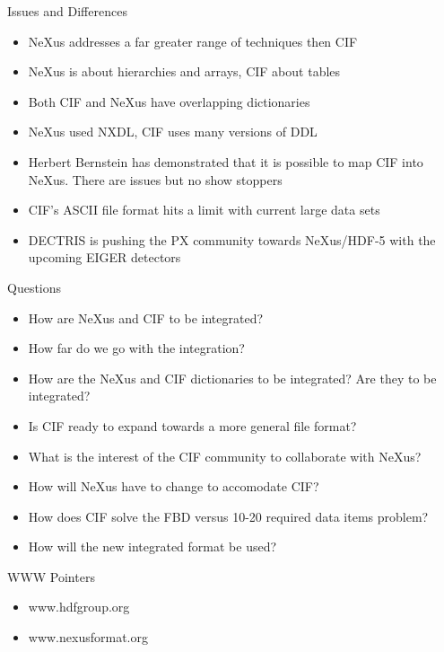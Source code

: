 \documentclass{beamer}
\begin{document}
\begin{frame}{Issues and Differences}
\begin{itemize}
\item NeXus addresses a far greater range of techniques then CIF
\item NeXus is about hierarchies and arrays, CIF about tables
\item Both CIF and NeXus have overlapping dictionaries
\item NeXus used NXDL, CIF uses many versions of DDL
\item Herbert Bernstein has demonstrated that it is possible to map CIF into NeXus. There are issues but 
 no show stoppers
 \item CIF's ASCII file format hits a limit with current large data sets
\item DECTRIS is pushing the PX community towards NeXus/HDF-5 with the upcoming EIGER detectors
\end{itemize}
\end{frame}

\begin{frame}{Questions}
\begin{itemize}
\item How are NeXus and CIF to be integrated?
\item How far do we go with the integration?
\item How are the NeXus and CIF dictionaries to be integrated? Are they to be integrated?
\item Is CIF ready to expand towards a more general file format?
\item What is the interest of the CIF community to collaborate with NeXus?
\item How will NeXus have to change to accomodate CIF?
\item How does CIF solve the FBD versus 10-20 required data items problem? 
\item How will the new integrated format be used?
\end{itemize}
\end{frame}

\begin{frame}{WWW Pointers}
\begin{itemize}
\item www.hdfgroup.org
\item www.nexusformat.org
\end{itemize}
\end{frame}
\end{document}
